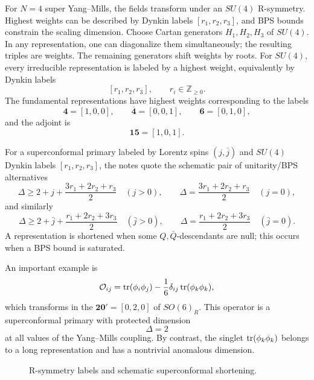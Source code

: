 For \(N=4\) super Yang--Mills, the fields transform under an \(SU(4)\)
R-symmetry.  Highest weights can be described by Dynkin labels
\([r_1,r_2,r_3]\), and BPS bounds constrain the scaling dimension.
Choose Cartan generators \(H_1,H_2,H_3\) of \(SU(4)\).  In any
representation, one can diagonalize them simultaneously; the resulting
triples are weights.  The remaining generators shift weights by roots.
For \(SU(4)\), every irreducible representation is labeled by a highest
weight, equivalently by Dynkin labels
\[
  [r_1,r_2,r_3],
  \qquad r_i\in\mathbb Z_{\ge0}.
\]
The fundamental representations have highest weights corresponding to
the labels
\[
  \mathbf4=[1,0,0],
  \qquad
  \overline{\mathbf4}=[0,0,1],
  \qquad
  \mathbf6=[0,1,0],
\]
and the adjoint is
\[
  \mathbf{15}=[1,0,1].
\]

For a superconformal primary labeled by Lorentz spins
\((j,\bar j)\) and \(SU(4)\) Dynkin labels \([r_1,r_2,r_3]\), the notes
quote the schematic pair of unitarity/BPS alternatives
\[
  \Delta\ge
  2+j+\frac{3r_1+2r_2+r_3}{2}
  \quad(j>0),
  \qquad
  \Delta=
  \frac{3r_1+2r_2+r_3}{2}
  \quad(j=0),
\]
and similarly
\[
  \Delta\ge
  2+\bar j+\frac{r_1+2r_2+3r_3}{2}
  \quad(\bar j>0),
  \qquad
  \Delta=
  \frac{r_1+2r_2+3r_3}{2}
  \quad(\bar j=0).
\]
A representation is shortened when some \(Q,\bar Q\)-descendants are
null; this occurs when a BPS bound is saturated.

An important example is
\[
  \mathcal O_{ij}
  =
  \tr(\phi_i\phi_j)-\frac16\delta_{ij}\tr(\phi_k\phi_k),
\]
which transforms in the \(\mathbf{20}'=[0,2,0]\) of \(SO(6)_R\).  This
operator is a superconformal primary with protected dimension
\[
  \Delta=2
\]
at all values of the Yang--Mills coupling.  By contrast, the singlet
\(\tr(\phi_k\phi_k)\) belongs to a long representation and has a
nontrivial anomalous dimension.

\begin{figure}[htbp]
\centering
{}
\caption{R-symmetry labels and schematic superconformal shortening.}
\end{figure}

